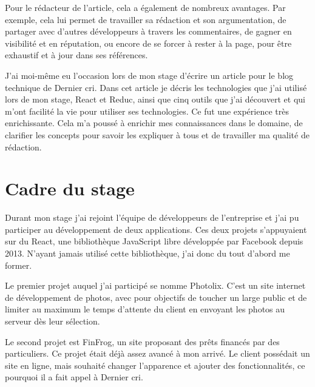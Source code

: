 \documentclass[12pt,a4paper]{article}
\begin{document}
  \bigskip

  Pour le rédacteur de l'article, cela a également de nombreux avantages.
  Par exemple, cela lui permet de travailler sa rédaction et son
  argumentation, de partager avec d'autres développeurs à travers les
  commentaires, de gagner en visibilité et en réputation, ou encore de se
  forcer à rester à la page, pour être exhaustif et à jour dans ses
  références.

  \bigskip

  J'ai moi-même eu l'occasion lors de mon stage d'écrire un article pour
  le blog technique de Dernier cri. Dans cet article je décris les
  technologies que j'ai utilisé lors de mon stage, React et Reduc, ainsi
  que cinq outils que j'ai découvert et qui m'ont facilité la vie pour
  utiliser ses technologies. Ce fut une expérience très enrichissante.
  Cela m'a poussé à enrichir mes connaissances dans le domaine, de
  clarifier les concepts pour savoir les expliquer à tous et de travailler
  ma qualité de rédaction.

  \newpage

  \section{Cadre du stage}\label{cadre-du-stage}

  \bigskip

  Durant mon stage j'ai rejoint l'équipe de développeurs de l'entreprise
  et j'ai pu participer au développement de deux applications. Ces deux
  projets s'appuyaient sur du React, une bibliothèque JavaScript libre
  développée par Facebook depuis 2013. N'ayant jamais utilisé cette
  bibliothèque, j'ai donc du tout d'abord me former.

  \bigskip

  Le premier projet auquel j'ai participé se nomme Photolix. C'est un site
  internet de développement de photos, avec pour objectifs de toucher un
  large public et de limiter au maximum le temps d'attente du client en
  envoyant les photos au serveur dès leur sélection.

  \bigskip

  Le second projet est FinFrog, un site proposant des prêts financés par
  des particuliers. Ce projet était déjà assez avancé à mon arrivé. Le
  client possédait un site en ligne, mais souhaité changer l'apparence et
  ajouter des fonctionnalités, ce pourquoi il a fait appel à Dernier cri.

  \bigskip
\end{document}

